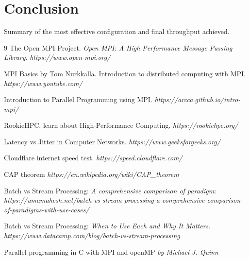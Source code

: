 \documentclass[11pt,a4paper]{article}
\begin{document}
	\section{Conclusion}
	Summary of the most effective configuration and final throughput achieved.
	
	\begin{thebibliography}{9}
		The Open MPI Project. \textit{Open MPI: A High Performance Message Passing Library}. \textit{https://www.open-mpi.org/}
		
		 MPI Basics by Tom Nurkkalla. Introduction to distributed computing with MPI. \textit{https://www.youtube.com/}
		
		 Introduction to Parallel Programming using MPI. \textit{https://arcca.github.io/intro-mpi/}
		
		 RookieHPC, learn about High-Performance Computing. \textit{https://rookiehpc.org/}
		
		 Latency vs Jitter in Computer Networks. \textit{https://www.geeksforgeeks.org/}
		
		Cloudflare internet speed test. \textit{https://speed.cloudflare.com/}
		
		CAP theorem \textit{https://en.wikipedia.org/wiki/CAP\_theorem}
		
		Batch vs Stream Processing: \textit{A comprehensive comparison of paradigm}: \textit{https://umamahesh.net/batch-vs-stream-processing-a-comprehensive-comparison-of-paradigms-with-use-cases/}
		
		Batch vs Stream Processing: \textit{When to Use Each and Why It Matters}. \textit{https://www.datacamp.com/blog/batch-vs-stream-processing}
		
		Parallel programming in C with MPI and openMP \textit{by Michael J. Quinn}
		
	\end{thebibliography}
	
	
\end{document}
